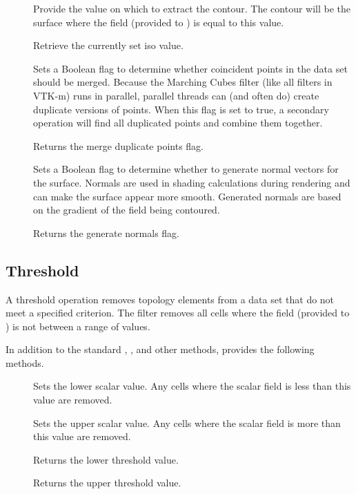 \begin{description}
\item[] Provide the value on which to extract the
  contour. The contour will be the surface where the field (provided to
  ) is equal to this value.
\item[] Retrieve the currently set iso value.
\item[] Sets a Boolean flag to determine
  whether coincident points in the data set should be merged. Because the
  Marching Cubes filter (like all filters in VTK-m) runs in parallel,
  parallel threads can (and often do) create duplicate versions of points.
  When this flag is set to true, a secondary operation will find all
  duplicated points and combine them together.
\item[] Returns the merge duplicate
  points flag.
\item[] Sets a Boolean flag to determine
  whether to generate normal vectors for the surface. Normals are used in
  shading calculations during rendering and can make the surface appear
  more smooth. Generated normals are based on the gradient of the field
  being contoured.
\item[] Returns the generate normals flag.
\end{description}


\subsection{Threshold}


A threshold operation removes topology elements from a data set that do not
meet a specified criterion. The  filter removes all
cells where the field (provided to ) is not between a
range of values.

In addition to the standard ,
, and other methods,
 provides the following methods.

\begin{description}
\item[] Sets the lower scalar value. Any cells
  where the scalar field is less than this value are removed.
\item[] Sets the upper scalar value. Any cells
  where the scalar field is more than this value are removed.
\item[] Returns the lower threshold value.
\item[] Returns the upper threshold value.
\end{description}




